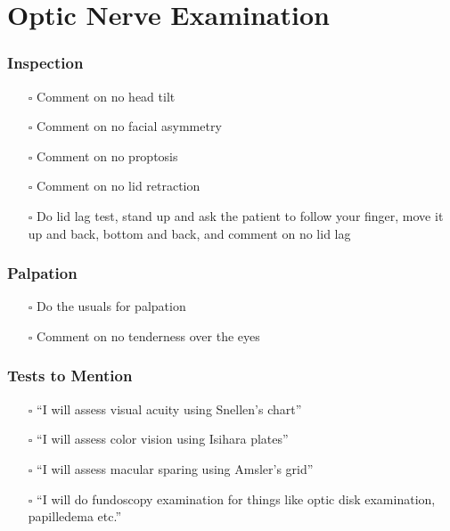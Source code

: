 \documentclass[
  13.5pt,
  a4paper,
  DIV=11,
  numbers=noendperiod]{scrreprt}
\providecommand{\tightlist}{%
  \setlength{\itemsep}{0pt}\setlength{\parskip}{0pt}}
\begin{document}
\section{Optic Nerve Examination}\label{optic-nerve-examination}

\subsubsection{Inspection}\label{inspection-4}

\begin{itemize}
\tightlist
\item[$\square$]
  Comment on no head tilt
\item[$\square$]
  Comment on no facial asymmetry
\item[$\square$]
  Comment on no proptosis
\item[$\square$]
  Comment on no lid retraction
\item[$\square$]
  Do lid lag test, stand up and ask the patient to follow your finger,
  move it up and back, bottom and back, and comment on no lid lag
\end{itemize}

\subsubsection{Palpation}\label{palpation-5}

\begin{itemize}
\tightlist
\item[$\square$]
  Do the usuals for palpation
\item[$\square$]
  Comment on no tenderness over the eyes
\end{itemize}

\subsubsection{Tests to Mention}\label{tests-to-mention}

\begin{itemize}
\tightlist
\item[$\square$]
  ``I will assess visual acuity using Snellen's chart''
\item[$\square$]
  ``I will assess color vision using Isihara plates''
\item[$\square$]
  ``I will assess macular sparing using Amsler's grid''
\item[$\square$]
  ``I will do fundoscopy examination for things like optic disk
  examination, papilledema etc.''
\end{itemize}
\end{document}
